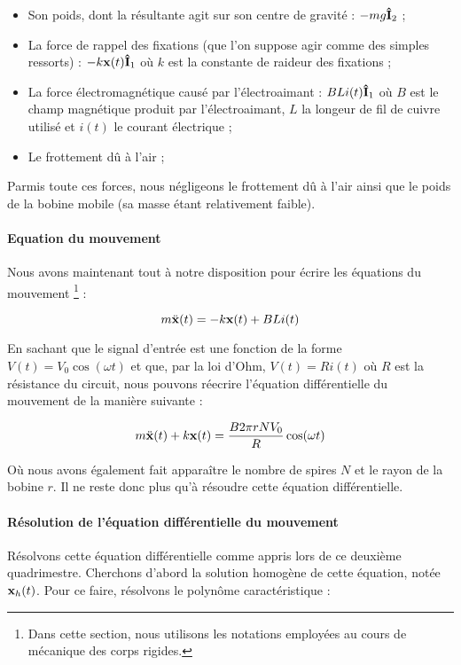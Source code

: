 \begin{itemize}
	\item Son poids, dont la résultante agit sur son centre de gravité : $-mg{\bf\hat{ I}}_2$ ;
	\item La force de rappel des fixations (que l'on suppose agir comme des simples
	ressorts) : $-k {\bf x}(t) {\bf\hat{ I}}_1$ où $k$ est la constante de raideur des fixations ;
	\item La force électromagnétique causé par l'électroaimant : $BLi(t) {\bf\hat{ I}}_1$ où
	$B$ est le champ magnétique produit par l'électroaimant, $L$ la longeur de fil de cuivre
	utilisé et $i(t)$ le courant électrique ;
	\item Le frottement dû à l'air ;
\end{itemize}

Parmis toute ces forces, nous négligeons le frottement dû à l'air ainsi que le poids
de la bobine mobile (sa masse étant relativement faible).

\paragraph{Equation du mouvement}
Nous avons maintenant tout à notre disposition pour écrire les équations du mouvement
\footnote{Dans cette section, nous utilisons les notations employées au cours de
mécanique des corps rigides.} :

$$m\ddot{\bf x}(t) = -k{\bf x}(t) + BLi(t)$$

En sachant que le signal d'entrée est une fonction de la forme $V(t) = V_0 \cos (\omega t)$ et
que, par la loi d'Ohm, $V(t) = Ri(t)$ où $R$ est la résistance du circuit, 
nous pouvons réecrire l'équation différentielle du mouvement de la manière suivante :

$$m\ddot{\bf x}(t) + k{\bf x}(t) = \frac{B2\pi rNV_0}{R}\cos (\omega t)$$

Où nous avons également fait apparaître le nombre de spires $N$ et le rayon de la bobine
$r$. Il ne reste donc plus qu'à résoudre cette équation différentielle.

\paragraph{Résolution de l'équation différentielle du mouvement}
Résolvons cette équation différentielle comme appris lors de ce deuxième
quadrimestre. Cherchons d'abord la solution homogène de cette équation, notée ${\bf x}_h(t)$.
Pour ce faire, résolvons le polynôme caractéristique :

